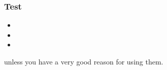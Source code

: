 \documentclass[11pt]{beamer}
\begin{document}
\begin{frame}

    \frametitle{Test}
        \begin{itemize}
            \item {} %
            \item {}
            \item {}
        \end{itemize}
\end{frame}

  \begin{visibleenv}
  
    \begin{beamerboxesrounded}
      [shadow=true, lower=strong warn]{}
      \Large\centering
      unless you have a very good reason for using them.
    \end{beamerboxesrounded}
\end{visibleenv}
\end{document}
